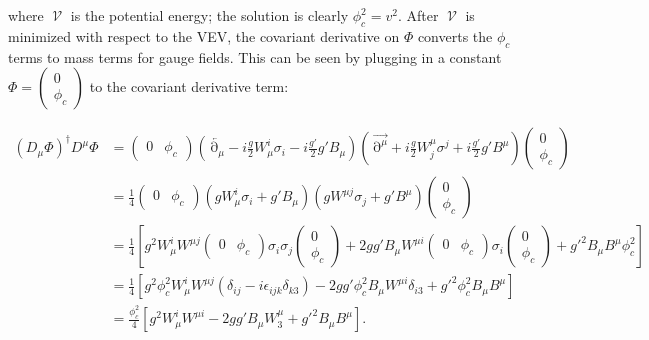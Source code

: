 \documentclass[%
 reprint,
nofootinbib,
 amsmath,amssymb,
 aps,
floatfix,
]{revtex4-1}
\DeclareMathOperator{\del}{\partial}
\DeclareMathOperator{\V}{\mathcal{V}}
\begin{document}
where $\V$ is the potential energy; the solution is clearly $\phi_c^2 = v^2$.
After $\V$ is minimized with respect to the VEV, the covariant derivative on $\Phi$ converts the $\phi_c$ terms to mass terms for gauge fields.
This can be seen by plugging in a constant $\Phi = \begin{pmatrix} 0 \\ \phi_c \end{pmatrix}$ to the covariant derivative term:
\begin{widetext}
\begin{equation}
\begin{split}
    \left(D_\mu\Phi\right)^\dag D^\mu\Phi &= \begin{pmatrix} 0 & \phi_c \end{pmatrix} \left(\overleftarrow{\del_\mu} - i\frac{g}{2}W_\mu^i\sigma_i-i\frac{g'}{2}g'B_\mu \right) \left(\overrightarrow{\del^\mu} + i\frac{g}{2}W_j^\mu\sigma^j+i\frac{g'}{2}g'B^\mu\right) \begin{pmatrix} 0 \\ \phi_c \end{pmatrix} \\
    &= \frac{1}{4}\begin{pmatrix} 0 & \phi_c \end{pmatrix} \left(gW_\mu^i\sigma_i + g'B_\mu\right)\left(gW^{\mu j}\sigma_j + g'B^\mu\right) \begin{pmatrix} 0 \\ \phi_c \end{pmatrix} \\
    &= \frac{1}{4}\left[g^2 W_\mu^iW^{\mu j} \begin{pmatrix} 0 & \phi_c \end{pmatrix} \sigma_i\sigma_j \begin{pmatrix} 0 \\ \phi_c \end{pmatrix} + 2gg' B_\mu W^{\mu i} \begin{pmatrix} 0 & \phi_c \end{pmatrix} \sigma_i \begin{pmatrix} 0 \\ \phi_c \end{pmatrix} + g'^2B_\mu B^\mu \phi_c^2 \right] \\
    &= \frac{1}{4}\left[g^2\phi_c^2 W_\mu^i W^{\mu j}\left(\delta_{ij}-i\epsilon_{ijk}\delta_{k3}\right) - 2gg'\phi_c^2 B_\mu W^{\mu i}\delta_{i3} + g'^2 \phi_c^2 B_\mu B^\mu\right] \\
    &= \frac{\phi_c^2}{4}\left[g^2 W_\mu^iW^{\mu i} - 2gg'B_\mu W^\mu_3 + g'^2 B_\mu B^\mu\right].
\end{split}
\end{equation}
\end{widetext}
\end{document}
